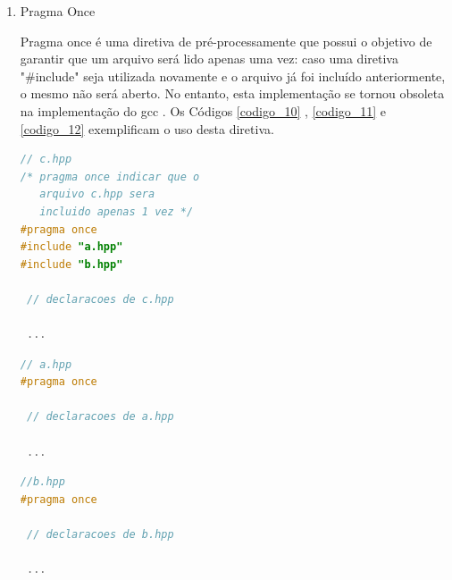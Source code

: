 \begin{enumerate}
\item Pragma Once

Pragma once é uma diretiva de pré-processamente que possui o objetivo de
 garantir que um arquivo será lido apenas uma vez: caso uma diretiva 
"\#include" seja utilizada novamente e o arquivo já foi incluído anteriormente,
 o mesmo não será aberto. No entanto, esta implementação se tornou obsoleta 
 na implementação do gcc \cite{gcc-pragma_once}. Os Códigos \ref{codigo_10} 
, \ref{codigo_11} e \ref{codigo_12} exemplificam o uso desta diretiva.



\begin{lstlisting}[language=C++,frame=single,captionpos=b,caption={
                                    Exemplo de arquivo c.hpp com guarda de 
                                         inclusão que utiliza \#pragma once},
                                                            label=codigo_10]
// c.hpp
/* pragma once indicar que o 
   arquivo c.hpp sera
   incluido apenas 1 vez */
#pragma once            
#include "a.hpp"
#include "b.hpp"

 // declaracoes de c.hpp

 ...

\end{lstlisting}

\begin{lstlisting}[language=C++,frame=single,captionpos=b,caption={
                                   Exemplo de arquivo a.hpp com guarda de 
                                    inclusão que utiliza \#pragma once},
                                                            label=codigo_11]
// a.hpp
#pragma once 

 // declaracoes de a.hpp

 ...

\end{lstlisting}

\begin{lstlisting}[language=C++,frame=single,captionpos=b,caption={ 
                                   Exemplo de arquivo b.hpp com guarda de 
                                      inclusão que utiliza \#pragma once},
                                                            label=codigo_12]
//b.hpp
#pragma once 

 // declaracoes de b.hpp

 ...

\end{lstlisting}

\end{enumerate}

